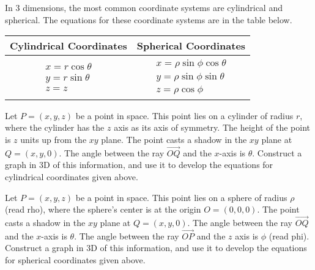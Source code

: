 In 3 dimensions, the most common coordinate systems are cylindrical and spherical.  The equations for these coordinate systems are in the table below. 
\begin{center}
\begin{tabular}{cc}
Cylindrical Coordinates & Spherical Coordinates\\
\hline
$\begin{array}{l}
x=r\cos\theta\\
y=r\sin\theta\\
z=z
\end{array}$
&
$\begin{array}{l}
x=\rho\sin\phi\cos\theta\\
y=\rho\sin\phi\sin\theta\\
z=\rho\cos\phi
\end{array}$
\end{tabular}
\end{center}

\begin{problem} 
Let $P=(x,y,z)$ be a point in space. This point lies on a cylinder of radius $r$, where the cylinder has the $z$ axis as its axis of symmetry.  The height of the point is $z$ units up from the $xy$ plane. The point casts a shadow in the $xy$ plane at $Q=(x,y,0)$.  The angle between the ray $\vec{OQ}$ and the $x$-axis is $\theta$. Construct a graph in 3D of this information, and use it to develop the equations for cylindrical coordinates given above.
\end{problem}

\begin{problem}   \label{derive spherical coordinates}
Let $P=(x,y,z)$ be a point in space. This point lies on a sphere of radius $\rho$ (read rho), where the sphere's center is at the origin $O=(0,0,0)$. The point casts a shadow in the $xy$ plane at $Q=(x,y,0)$.  The angle between the ray $\vec{OQ}$ and the $x$-axis is $\theta$. The angle between the ray $\vec{OP}$ and the $z$ axis is $\phi$ (read phi).  
Construct a graph in 3D of this information, and use it to develop the equations for spherical coordinates given above.
\end{problem}


